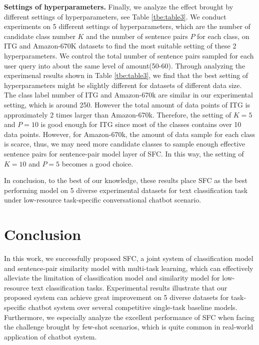 \documentclass[letterpaper]{article} %
\begin{document}
  \textbf{Settings  of  hyperparameters.} Finally, we analyze the effect brought
  by  different  settings  of  hyperparameters,  see  Table \ref{tbe:table3}. We
  conduct  experiments on 5 different settings of hyperparameters, which are the
  number  of candidate class number $K$ and the number of sentence pairs $P$ for
  each  class, on ITG and Amazon-670K datasets to find the most suitable setting
  of  these  2  hyperparameters.  We  control the total number of sentence pairs
  sampled  for  each  user  query  into  about  the same level of amount(50-60).
  Through  analyzing the experimenal results shown in Table \ref{tbe:table3}, we
  find  that the best setting of hyperparameters might be slightly different for
  datasets of different data size. The class label number of ITG and Amazon-670k
  are  similar  in  our  experimental  setting, which is around 250. However the
  total  amount  of  data  points  of  ITG  is approximately 2 times larger than
  Amazon-670k. Therefore, the setting of $K=5$ and $P=10$ is good enough for ITG
  since  most  of  the  classes  contains  over  10  data  points.  However, for
  Amazon-670k,  the amount of data sample for each class is scarce, thus, we may
  need  more  candidate  classes  to  sample enough effective sentence pairs for
  sentence-pair model layer of SFC. In this way, the setting of $K=10$ and $P=5$
  becomes a good choice.

  In  conclusion,  to  the best of our knowledge, these results place SFC as the
  best   performing   model   on   5  diverse  experimental  datasets  for  text
  classification  task  under  low-resource task-specific conversational chatbot
  scenario.

  \section{Conclusion}
  In  this  work, we successfully proposed SFC, a joint system of classification
  model  and  sentence-pair similarity model with multi-task learning, which can
  effectively  alleviate  the  limitation of classification model and similarity
  model   for  low-resource  text  classification  tasks.  Experimental  results
  illustrate that our proposed system can achieve great improvement on 5 diverse
  datasets for task-specific chatbot system over several competitive single-task
  baseline  models. Furthermore, we especially analyze the excellent performance
  of SFC when facing the challenge brought by few-shot scenarios, which is quite
  common in real-world application of chatbot system.

  
  
\end{document}
